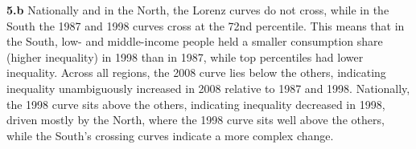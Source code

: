 \documentclass[
  letterpaper,
  DIV=11,
  numbers=noendperiod]{scrartcl}
\begin{document}
\textbf{5.b} Nationally and in the North, the Lorenz curves do not
cross, while in the South the 1987 and 1998 curves cross at the 72nd
percentile. This means that in the South, low- and middle-income people
held a smaller consumption share (higher inequality) in 1998 than in
1987, while top percentiles had lower inequality. Across all regions,
the 2008 curve lies below the others, indicating inequality
unambiguously increased in 2008 relative to 1987 and 1998. Nationally,
the 1998 curve sits above the others, indicating inequality decreased in
1998, driven mostly by the North, where the 1998 curve sits well above
the others, while the South's crossing curves indicate a more complex
change.
\end{document}
